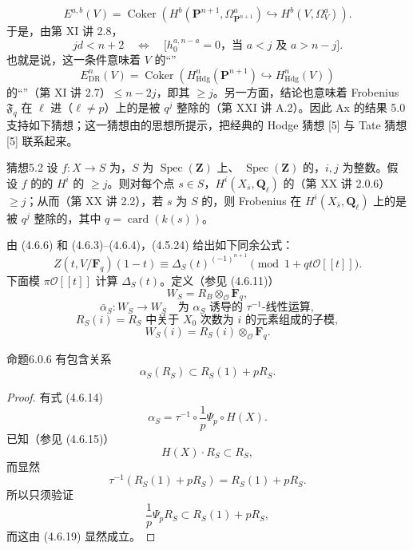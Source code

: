 \[
E^{a,b}(V)=\operatorname{Coker}\left(H^b(\mathbf P^{n+1},\Omega_{\mathbf P^{n+1}}^a)
\hookrightarrow H^b(V,\Omega_V^a)\right).\tag{5.1.3}
\]
于是，由第 XI 讲 2.8，
\[
jd<n+2\quad\Longleftrightarrow\quad
\bigl[h_0^{a,n-a}=0\text{，当 }a<j\text{ 及 }a>n-j\bigr].\tag{5.1.4}
\]
也就是说，这一条件意味着 $V$ 的“”
\[
E_{\mathrm{DR}}^n(V)=\operatorname{Coker}\left(H_{\mathrm{Hdg}}^n(\mathbf P^{n+1})
\hookrightarrow H_{\mathrm{Hdg}}^n(V)\right)
\]
的“”（第 XI 讲 2.7）$\le n-2j$，即其 $\ge j$。另一方面，结论也意味着 Frobenius $\mathfrak F_q$ 在 $\ell$ 进（$\ell\ne p$）上的是被 $q^j$ 整除的（第 XXI 讲 A.2）。因此 Ax 的结果 5.0 支持如下猜想；这一猜想由的思想所提示，把经典的 Hodge 猜想 [5] 与 Tate 猜想 [5] 联系起来。
\begin{SGAresult}{猜想}{5.2}
设 $f:X\to S$ 为，$S$ 为 $\operatorname{Spec}(\mathbf Z)$ 上、 $\operatorname{Spec}(\mathbf Z)$ 的，$i,j$ 为整数。假设 $f$ 的的 $H^i$ 的 $\ge j$。则对每个点 $s\in S$，$H^i(X_{\bar s},\mathbf Q_\ell)$ 的（第 XX 讲 2.0.6）$\ge j$；从而（第 XX 讲 2.2），若 $s$ 为 $S$ 的，则 Frobenius 在 $H^i(X_{\bar s},\mathbf Q_\ell)$ 上的是被 $q^j$ 整除的，其中 $q=\operatorname{card}(k(s))$。
\end{SGAresult}
由 (4.6.6) 和 (4.6.3)--(4.6.4)，(4.5.24) 给出如下同余公式：
\[
Z(t,V/\mathbf F_q)(1-t)\equiv\Delta_S(t)^{(-1)^{n+1}}
\pmod{1+qt\mathscr O[[t]]}.\tag{6.0.1}
\]
下面模 $\pi\mathscr O[[t]]$ 计算 $\Delta_S(t)$。定义（参见 (4.6.11)）
\[
W_S=R_B\otimes_{\mathscr O}\mathbf F_q,\tag{6.0.2}
\]
\[
\bar\alpha_S:W_S\longrightarrow W_S\quad\text{为 }\alpha_S\text{ 诱导的 }\tau^{-1}\text{-线性运算},\tag{6.0.3}
\]
\[
R_S(i)=R_S\text{ 中关于 }X_0\text{ 次数为 }i\text{ 的元素组成的子模},\tag{6.0.4}
\]
\[
W_S(i)=R_S(i)\otimes_{\mathscr O}\mathbf F_q.\tag{6.0.5}
\]
\begin{SGAresult}{命题}{6.0.6}
有包含关系
\[
\alpha_S(R_S)\subset R_S(1)+pR_S.
\]
\end{SGAresult}
\begin{proof}
有式 (4.6.14)
\[
\alpha_S=\tau^{-1}\circ\frac1p\Psi_p\circ H(X).\tag{6.0.7}
\]
已知（参见 (4.6.15)）
\[
H(X)\cdot R_S\subset R_S,\tag{6.0.8}
\]
而显然
\[
\tau^{-1}(R_S(1)+pR_S)=R_S(1)+pR_S.\tag{6.0.9}
\]
所以只须验证
\[
\frac1p\Psi_pR_S\subset R_S(1)+pR_S,\tag{6.0.10}
\]
而这由 (4.6.19) 显然成立。
\end{proof}

